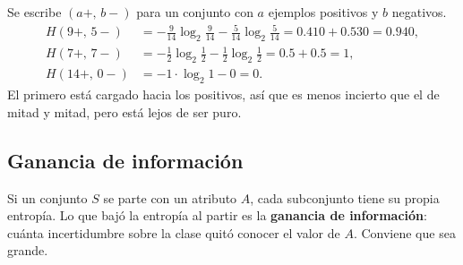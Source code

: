 \documentclass[11pt,letterpaper]{article}
\begin{document}
\begin{center}
\end{center}

\begin{ejemplo}
    Se escribe $(a+,\, b-)$ para un conjunto con $a$ ejemplos positivos
    y $b$ negativos.
    \begin{align*}
        H(9+,\,5-) &= -\tfrac{9}{14}\log_2\tfrac{9}{14}
                      - \tfrac{5}{14}\log_2\tfrac{5}{14}
                    = 0.410 + 0.530 = 0.940 , \\
        H(7+,\,7-) &= -\tfrac{1}{2}\log_2\tfrac{1}{2}
                      - \tfrac{1}{2}\log_2\tfrac{1}{2}
                    = 0.5 + 0.5 = 1 , \\
        H(14+,\,0-) &= -1 \cdot \log_2 1 - 0 = 0 .
    \end{align*}
    El primero está cargado hacia los positivos, así que es menos
    incierto que el de mitad y mitad, pero está lejos de ser puro.
\end{ejemplo}


\subsection*{Ganancia de información}

Si un conjunto $S$ se parte con un atributo $A$, cada subconjunto
tiene su propia entropía. Lo que bajó la entropía al partir es la
\textbf{ganancia de información}: cuánta incertidumbre sobre la clase
quitó conocer el valor de $A$. Conviene que sea grande.
\end{document}
